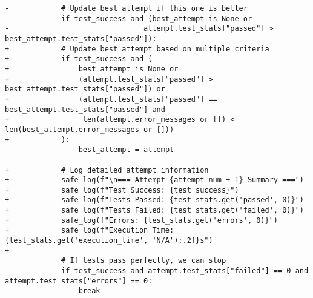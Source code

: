 \begin{lstlisting}[style=diffstyle]
-            # Update best attempt if this one is better
-            if test_success and (best_attempt is None or 
-                               attempt.test_stats["passed"] > best_attempt.test_stats["passed"]):
+            # Update best attempt based on multiple criteria
+            if test_success and (
+                best_attempt is None or
+                (attempt.test_stats["passed"] > best_attempt.test_stats["passed"]) or
+                (attempt.test_stats["passed"] == best_attempt.test_stats["passed"] and
+                 len(attempt.error_messages or []) < len(best_attempt.error_messages or []))
+            ):
                 best_attempt = attempt
             
+            # Log detailed attempt information
+            safe_log(f"\n=== Attempt {attempt_num + 1} Summary ===")
+            safe_log(f"Test Success: {test_success}")
+            safe_log(f"Tests Passed: {test_stats.get('passed', 0)}")
+            safe_log(f"Tests Failed: {test_stats.get('failed', 0)}")
+            safe_log(f"Errors: {test_stats.get('errors', 0)}")
+            safe_log(f"Execution Time: {test_stats.get('execution_time', 'N/A'):.2f}s")
+            
             # If tests pass perfectly, we can stop
             if test_success and attempt.test_stats["failed"] == 0 and attempt.test_stats["errors"] == 0:
                 break
\end{lstlisting}